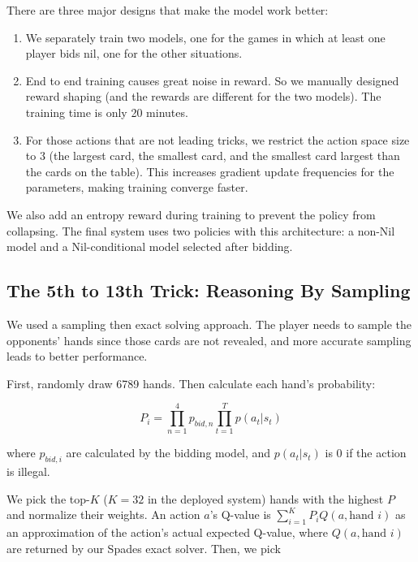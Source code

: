 \documentclass{article}
\begin{document}
There are three major designs that make the model work better:

\begin{enumerate}


\item We separately train two models, one for the games in which at least one player bids nil, one for the other situations.

\item End to end training causes great noise in reward. So we manually designed reward shaping (and the rewards are different for the two models). The training time is only 20 minutes.

\item For those actions that are not leading tricks, we restrict the action space size to 3 (the largest card, the smallest card, and the smallest card largest than the cards on the table). This increases gradient update frequencies for the parameters, making training converge faster.


\end{enumerate}

We also add an entropy reward during training to prevent the policy from collapsing. The final system uses two policies with this architecture: a non-Nil model and a Nil-conditional model selected after bidding.

\subsection{The 5th to 13th Trick: Reasoning By Sampling}
\label{sec:late-game}

We used a sampling then exact solving approach. The player needs to sample the opponents' hands since those cards are not revealed, and more accurate sampling leads to better performance.

First, randomly draw 6789 hands. Then calculate each hand's probability:

$$P_i=\prod_{n=1}^4 p_{bid,n} \prod_{t=1}^T p(a_t|s_t)$$

where $p_{bid,i}$ are calculated by the bidding model, and $p(a_t|s_t)$ is 0 if the action is illegal.

We pick the top-$K$ ($K=32$ in the deployed system) hands with the highest $P$ and normalize their weights. An action $a$'s Q-value is $\sum_{i=1}^K P_iQ(a,\textrm{hand }i)$ as an approximation of the action's actual expected Q-value, where $Q(a,\textrm{hand }i)$ are returned by our Spades exact solver. Then, we pick
\end{document}
